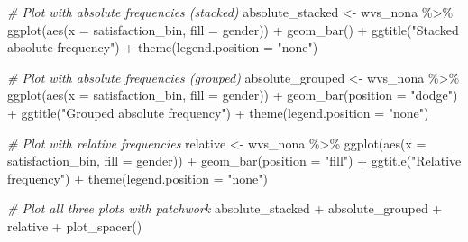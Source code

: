 \documentclass[
]{book}
\newenvironment{Shaded}{\begin{snugshade}}{\end{snugshade}}
\newcommand{\AttributeTok}[1]{\textcolor[rgb]{0.77,0.63,0.00}{#1}}
\newcommand{\CommentTok}[1]{\textcolor[rgb]{0.56,0.35,0.01}{\textit{#1}}}
\newcommand{\FunctionTok}[1]{\textcolor[rgb]{0.00,0.00,0.00}{#1}}
\newcommand{\NormalTok}[1]{#1}
\newcommand{\OtherTok}[1]{\textcolor[rgb]{0.56,0.35,0.01}{#1}}
\newcommand{\SpecialCharTok}[1]{\textcolor[rgb]{0.00,0.00,0.00}{#1}}
\newcommand{\StringTok}[1]{\textcolor[rgb]{0.31,0.60,0.02}{#1}}
\begin{document}
\begin{Shaded}
\begin{Highlighting}[]
\CommentTok{\# Plot with absolute frequencies (stacked)}
\NormalTok{absolute\_stacked }\OtherTok{\textless{}{-}}\NormalTok{ wvs\_nona }\SpecialCharTok{\%\textgreater{}\%}
  \FunctionTok{ggplot}\NormalTok{(}\FunctionTok{aes}\NormalTok{(}\AttributeTok{x =}\NormalTok{ satisfaction\_bin,}
             \AttributeTok{fill =}\NormalTok{ gender)) }\SpecialCharTok{+}
  \FunctionTok{geom\_bar}\NormalTok{() }\SpecialCharTok{+}
  \FunctionTok{ggtitle}\NormalTok{(}\StringTok{"Stacked absolute frequency"}\NormalTok{) }\SpecialCharTok{+}
  \FunctionTok{theme}\NormalTok{(}\AttributeTok{legend.position =} \StringTok{"none"}\NormalTok{)}

\CommentTok{\# Plot with absolute frequencies (grouped)}
\NormalTok{absolute\_grouped }\OtherTok{\textless{}{-}}\NormalTok{ wvs\_nona }\SpecialCharTok{\%\textgreater{}\%}
  \FunctionTok{ggplot}\NormalTok{(}\FunctionTok{aes}\NormalTok{(}\AttributeTok{x =}\NormalTok{ satisfaction\_bin,}
             \AttributeTok{fill =}\NormalTok{ gender)) }\SpecialCharTok{+}
  \FunctionTok{geom\_bar}\NormalTok{(}\AttributeTok{position =} \StringTok{"dodge"}\NormalTok{) }\SpecialCharTok{+}
  \FunctionTok{ggtitle}\NormalTok{(}\StringTok{"Grouped absolute frequency"}\NormalTok{) }\SpecialCharTok{+}
  \FunctionTok{theme}\NormalTok{(}\AttributeTok{legend.position =} \StringTok{"none"}\NormalTok{)}

\CommentTok{\# Plot with relative frequencies}
\NormalTok{relative }\OtherTok{\textless{}{-}}\NormalTok{ wvs\_nona }\SpecialCharTok{\%\textgreater{}\%}
  \FunctionTok{ggplot}\NormalTok{(}\FunctionTok{aes}\NormalTok{(}\AttributeTok{x =}\NormalTok{ satisfaction\_bin,}
             \AttributeTok{fill =}\NormalTok{ gender)) }\SpecialCharTok{+}
  \FunctionTok{geom\_bar}\NormalTok{(}\AttributeTok{position =} \StringTok{"fill"}\NormalTok{) }\SpecialCharTok{+}
  \FunctionTok{ggtitle}\NormalTok{(}\StringTok{"Relative frequency"}\NormalTok{) }\SpecialCharTok{+}
  \FunctionTok{theme}\NormalTok{(}\AttributeTok{legend.position =} \StringTok{"none"}\NormalTok{)}

\CommentTok{\# Plot all three plots with \textquotesingle{}patchwork\textquotesingle{}}
\NormalTok{absolute\_stacked }\SpecialCharTok{+}\NormalTok{ absolute\_grouped }\SpecialCharTok{+}\NormalTok{ relative }\SpecialCharTok{+} \FunctionTok{plot\_spacer}\NormalTok{()}
\end{Highlighting}
\end{Shaded}
\end{document}

